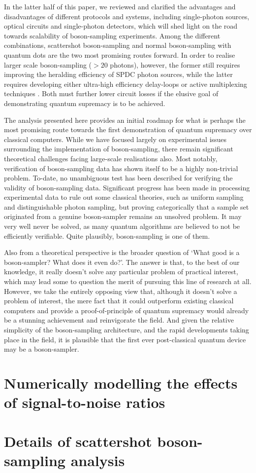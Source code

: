 \documentclass[aps,rmp,twocolumn,amsmath,amssymb,nofootinbib,superscriptaddress]{revtex4}
\begin{document}
In the latter half of this paper, we reviewed and clarified the advantages and disadvantages of different protocols and systems, including single-photon sources, optical circuits and single-photon detectors, which will shed light on the road towards scalability of boson-sampling experiments. Among the different combinations, scattershot boson-sampling and normal boson-sampling with quantum dots are the two most promising routes forward. In order to realise larger scale boson-sampling ($>20$ photons), however, the former still requires improving the heralding efficiency of SPDC photon sources, while the latter requires developing either ultra-high efficiency delay-loops or active multiplexing techniques \cite{bib:89}. Both must further lower circuit losses if the elusive goal of demonstrating quantum supremacy is to be achieved.

The analysis presented here provides an initial roadmap for what is perhaps the most promising route towards the first demonstration of quantum supremacy over classical computers. While we have focused largely on experimental issues surrounding the implementation of boson-sampling, there remain significant theoretical challenges facing large-scale realisations also. Most notably, verification of boson-sampling data has shown itself to be a highly non-trivial problem. To-date, no unambiguous test has been described for verifying the validity of boson-sampling data. Significant progress has been made in processing experimental data to rule out some classical theories, such as uniform sampling and distinguishable photon sampling, but proving categorically that a sample set originated from a genuine boson-sampler remains an unsolved problem. It may very well never be solved, as many quantum algorithms are believed to not be efficiently verifiable. Quite plausibly, boson-sampling is one of them.

Also from a theoretical perspective is the broader question of `What good is a boson-sampler? What does it even do?'. The answer is that, to the best of our knowledge, it really doesn't solve any particular problem of practical interest, which may lead some to question the merit of pursuing this line of research at all. However, we take the entirely opposing view that, although it doesn't solve a problem of interest, the mere fact that it could outperform existing classical computers and provide a proof-of-principle of quantum supremacy would already be a stunning achievement and reinvigorate the field. And given the relative simplicity of the boson-sampling architecture, and the rapid developments taking place in the field, it is plausible that the first ever post-classical quantum device may be a boson-sampler.

%
%

\begin{acknowledgments}
\end{acknowledgments}

\appendix

\section{Numerically modelling the effects of signal-to-noise ratios}

\section{Details of scattershot boson-sampling analysis}

%
%


\end{document}
